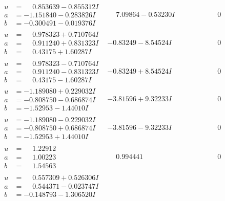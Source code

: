 \documentclass[1p]{elsarticle_modified}
\theoremstyle{definition}
\begin{document}
$$\begin{array}{c|c|c}
\begin{aligned}
u &= \phantom{-}0.853639 - 0.855312 I \\
a &= -1.151840 - 0.283826 I \\
b &= -0.300491 - 0.019376 I\end{aligned}
 & \phantom{-}7.09864 - 0.53230 I & \phantom{-0.000000 } 0 \\ \hline\begin{aligned}
u &= \phantom{-}0.978323 + 0.710764 I \\
a &= \phantom{-}0.911240 + 0.831323 I \\
b &= \phantom{-}0.43175 + 1.60287 I\end{aligned}
 & -0.83249 - 8.54524 I & \phantom{-0.000000 } 0 \\ \hline\begin{aligned}
u &= \phantom{-}0.978323 - 0.710764 I \\
a &= \phantom{-}0.911240 - 0.831323 I \\
b &= \phantom{-}0.43175 - 1.60287 I\end{aligned}
 & -0.83249 + 8.54524 I & \phantom{-0.000000 } 0 \\ \hline\begin{aligned}
u &= -1.189080 + 0.229032 I \\
a &= -0.808750 - 0.686874 I \\
b &= -1.52953 - 1.44010 I\end{aligned}
 & -3.81596 + 9.32233 I & \phantom{-0.000000 } 0 \\ \hline\begin{aligned}
u &= -1.189080 - 0.229032 I \\
a &= -0.808750 + 0.686874 I \\
b &= -1.52953 + 1.44010 I\end{aligned}
 & -3.81596 - 9.32233 I & \phantom{-0.000000 } 0 \\ \hline\begin{aligned}
u &= \phantom{-}1.22912\phantom{ +0.000000I} \\
a &= \phantom{-}1.00223\phantom{ +0.000000I} \\
b &= \phantom{-}1.54563\phantom{ +0.000000I}\end{aligned}
 & \phantom{-}0.994441\phantom{ +0.000000I} & \phantom{-0.000000 } 0 \\ \hline\begin{aligned}
u &= \phantom{-}0.557309 + 0.526306 I \\
a &= \phantom{-}0.544371 - 0.023747 I \\
b &= -0.148793 - 1.306520 I\end{aligned}

\end{array}$$
\end{document}
